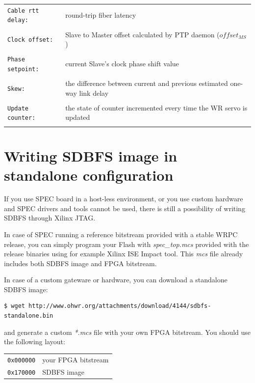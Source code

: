 \documentclass[a4paper, 12pt]{article}
\newcommand{\code}[1]{\texttt{#1}}
\newcommand{\codeHook}[1]{\mbox{\ttfamily\MakeTextUppercase{#1}}}
\begin{document}
\begin{longtable}{  p{4.5cm}  p{10cm} }
  \code{Cable rtt delay:} & round-trip fiber latency\\
 & \\

  \code{Clock offset:} & Slave to Master offset calculated by \codeHook{ptp} daemon
(\( offset_{MS} \))\\
 & \\

  \code{Phase setpoint:} & current Slave's clock phase shift value\\
 & \\

  \code{Skew:} & the difference between current and previous estimated
one-way link delay\\
 & \\

  \code{Update counter:} & the state of counter incremented every time
the \codeHook{wr} servo is updated\\
 & \\

\end{longtable}



\clearpage
\section{Writing SDBFS image in standalone configuration}
\label{Writing SDBFS image in standalone configuration}

If you use \codeHook{spec} board in a host-less environment, or you use custom
hardware and \codeHook{spec} drivers and tools cannot be used, there is still a
possibility of writing \codeHook{sdbfs} through Xilinx JTAG.

\vspace{1em}
In case of \codeHook{spec} running a reference bitstream provided with a stable
\codeHook{wrpc} release, you can simply program your Flash with \textit{spec\_top.mcs}
provided with the release binaries using for example Xilinx ISE Impact tool.
This \textit{mcs} file already includes both \codeHook{sdbfs} image and FPGA bitstream.

In case of a custom gateware or hardware, you can download a standalone
\codeHook{sdbfs} image:
\begin{lstlisting}
$ wget http://www.ohwr.org/attachments/download/4144/sdbfs-standalone.bin
\end{lstlisting}
and generate a custom \textit{*.mcs} file with your own FPGA bitstream. You should
use the following layout:
\begin{longtable}{  l  l }
\code{0x000000} & your FPGA bitstream \\
\code{0x170000} & \codeHook{sdbfs} image\\
\end{longtable}
\end{document}
